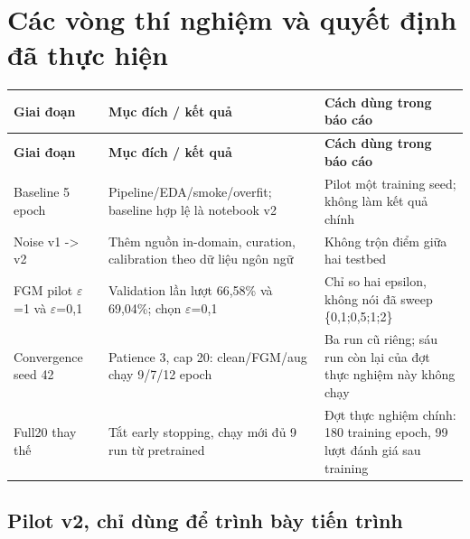 \documentclass[11pt,a4paper]{article}
\newlength{\reporttablewidth}
\begin{document}
\FloatBarrier\section{Các vòng thí nghiệm và quyết định đã thực hiện}

\begingroup
\small
\setlength{\tabcolsep}{4pt}
\setlength{\reporttablewidth}{\dimexpr\linewidth-4\tabcolsep\relax}
\renewcommand{\arraystretch}{1.15}
\begin{longtable}{@{}>{\raggedright\arraybackslash}p{0.23000\reporttablewidth}>{\raggedright\arraybackslash}p{0.39000\reporttablewidth}>{\raggedright\arraybackslash}p{0.38000\reporttablewidth}@{}}
\toprule
\textbf{Giai đoạn} & \textbf{Mục đích / kết quả} & \textbf{Cách dùng trong báo cáo} \\
\midrule
\endfirsthead
\toprule
\textbf{Giai đoạn} & \textbf{Mục đích / kết quả} & \textbf{Cách dùng trong báo cáo} \\
\midrule
\endhead
\bottomrule
\endlastfoot
Baseline 5 epoch & Pipeline/EDA/smoke/overfit; baseline hợp lệ là notebook v2 & Pilot một training seed; không làm kết quả chính \\
Noise v1 -> v2 & Thêm nguồn in-domain, curation, calibration theo dữ liệu ngôn ngữ & Không trộn điểm giữa hai testbed \\
FGM pilot \ensuremath{\varepsilon}=1 và \ensuremath{\varepsilon}=0,1 & Validation lần lượt 66,58\% và 69,04\%; chọn \ensuremath{\varepsilon}=0,1 & Chỉ so hai epsilon, không nói đã sweep \{0,1;0,5;1;2\} \\
Convergence seed 42 & Patience 3, cap 20: clean/FGM/aug chạy 9/7/12 epoch & Ba run cũ riêng; sáu run còn lại của đợt thực nghiệm này không chạy \\
Full20 thay thế & Tắt early stopping, chạy mới đủ 9 run từ pretrained & Đợt thực nghiệm chính: 180 training epoch, 99 lượt đánh giá sau training \\
\end{longtable}
\endgroup

\subsection*{Pilot v2, chỉ dùng để trình bày tiến trình}
\end{document}
